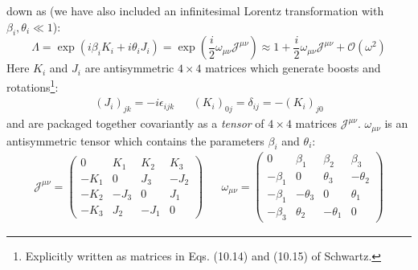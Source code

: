 \documentclass[12pt, oneside]{article}   	%
\theoremstyle{definition}
\begin{document}
\begin{itemize}
	down as (we have also included an infinitesimal Lorentz transformation with $\beta_i, \theta_i \ll 1$):
	\begin{equation}
		\Lambda = \exp(i\beta_i K_i + i \theta_i J_i) = \exp\left(\frac{i}{2}\omega_{\mu\nu} \mathcal{J}^{\mu\nu}\right)\approx 1 + \frac{i}{2}\omega_{\mu\nu} \mathcal J^{\mu\nu} + \mathcal O(\omega^2)
		\label{eq:general_lorentz}
	\end{equation}
	Here $K_i$ and $J_i$ are antisymmetric $4\times 4$ matrices which generate boosts and rotations\footnote{Explicitly 
	written as matrices in Eqs. (10.14) and (10.15) of Schwartz.}:
	\begin{align}
		(J_i)_{jk} = -i \epsilon_{ijk} && (K_i)_{0j} = \delta_{ij} = - (K_i)_{j0}
	\end{align}
	and are packaged together covariantly as a \textit{tensor} of $4\times 4$ matrices $\mathcal J^{\mu\nu}$. 
	$\omega_{\mu\nu}$ is an antisymmetric tensor which contains the parameters $\beta_i$ and $\theta_i$:
		\begin{align}
		\mathcal J^{\mu\nu} = \begin{pmatrix} 0 & K_1 & K_2 & K_3 \\ -K_1 & 0 & J_3 & -J_2 \\ -K_2 & -J_3 & 0 & J_1 \\ -K_3 & J_2 & -J_1 & 0 \end{pmatrix} &&
		\omega_{\mu\nu} = \begin{pmatrix} 0 & \beta_1 & \beta_2 & \beta_3 \\ -\beta_1 & 0 & \theta_3 & -\theta_2 \\ -\beta_1 & -\theta_3 & 0 & \theta_1 \\ 
		-\beta_3 & \theta_2 & -\theta_1 & 0 \end{pmatrix}
	\end{align}


\end{itemize}
\end{document}
